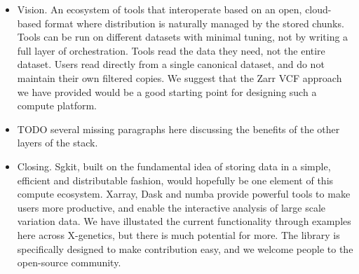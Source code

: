 \documentclass[a4paper,num-refs]{oup-contemporary}
\begin{document}
\begin{itemize}
\item Vision. An ecosystem of tools that interoperate
based on an open, cloud-based format where distribution is naturally
managed by the stored chunks. Tools can be run on different datasets
with minimal tuning, not by writing a full layer of orchestration.
Tools read the data they need, not the entire dataset. Users read
directly from a single canonical dataset, and do not maintain
their own filtered copies. We suggest that the Zarr VCF approach
we have provided would be a good starting point for designing
such a compute platform.

\item TODO several missing paragraphs here discussing the
benefits of the other layers of the stack.

\item Closing. Sgkit, built on the fundamental idea of storing
data in a simple, efficient and distributable fashion, would
hopefully be one element of this compute ecosystem.
Xarray, Dask and numba provide powerful tools to make users
more productive, and enable the interactive analysis of large
scale variation data. We have illustated the current functionality
through examples here across X-genetics, but there is much
potential for more. The library is specifically designed to make
contribution easy, and we welcome people to the open-source
community.

\end{itemize}




\end{document}
